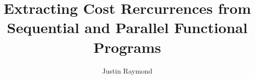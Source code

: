 \documentclass[11pt, ma]{westhesis}
\title{Extracting Cost Rercurrences from Sequential and Parallel Functional Programs}
\author{Justin Raymond}
\begin{document}
\frontmatter
\maketitle
\makededication
\makeack
\makeabstract        %
\tableofcontents

\mainmatter












\end{document}
